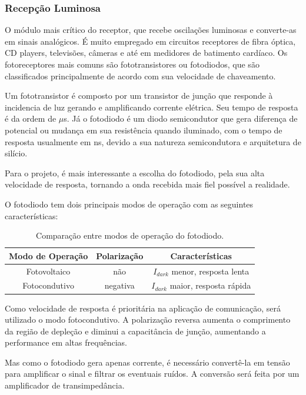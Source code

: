 	\subsubsection{Recepção Luminosa}\label{method-hard-photodiode}
	
	O módulo mais crítico do receptor, que recebe oscilações luminosas e converte-as em sinais analógicos. É muito empregado em circuitos receptores de fibra óptica, CD players, televisões, câmeras e até em medidores de batimento cardíaco. Os fotoreceptores mais comuns são fototransistores ou fotodiodos, que são classificados principalmente de acordo com sua velocidade de chaveamento. 
	
	Um fototransistor é composto por um transistor de junção que responde à incidencia de luz gerando e amplificando corrente elétrica. Seu tempo de resposta é da ordem de $\mu$s. Já o fotodiodo é um diodo semicondutor que gera diferença de potencial ou mudança em sua resistência quando iluminado, com o tempo de resposta usualmente em ns, devido a sua natureza semicondutora e arquitetura de silício.
	
	Para o projeto, é mais interessante a escolha do fotodiodo, pela sua alta velocidade de resposta, tornando a onda recebida mais fiel possível a realidade.
	
	O fotodiodo tem dois principais modos de operação com as seguintes características:
	
	\begin{table}[ht]
		\caption{Comparação entre modos de operação do fotodiodo.}
		\centering
		\begin{tabular}{c c c}
			\hline
			Modo de Operação  & Polarização & Características \\ \hline
			Fotovoltaico & não & $I_{dark}$ menor, resposta lenta \\
			Fotocondutivo & negativa & $I_{dark}$ maior, resposta rápida \\ \hline
		\end{tabular}
		\label{tab_photodiode_comp}
	\end{table}
	
	Como velocidade de resposta é prioritária na aplicação de comunicação, será utilizado o modo fotocondutivo. A polarização reversa aumenta o comprimento da região de depleção e diminui a capacitância de junção, aumentando a performance em altas frequências.
	
	Mas como o fotodiodo gera apenas corrente, é necessário convertê-la em tensão para amplificar o sinal e filtrar os eventuais ruídos. A conversão será feita por um amplificador de transimpedância.
	
